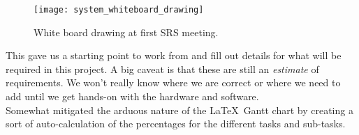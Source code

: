 \documentclass[compsoc,draftclsnofoot,onecolumn,10pt]{IEEEtran}
\begin{document}
\begin{itemize}
            \begin{figure}[H]
              	\texttt{[image: system\_whiteboard\_drawing]}
               \caption{White board drawing at first SRS meeting.}
           \end{figure}

            This gave us a starting point to work from and fill out details for
            what will be required in this project. A big caveat is that these
            are still an \textit{estimate} of requirements. We won't really know
            where we are correct or where we need to add until we get hands-on
            with the hardware and software.\\
            Somewhat mitigated the arduous nature of the \LaTeX~Gantt chart by
            creating a sort of auto-calculation of the percentages for the
            different tasks and sub-tasks.

	\end{itemize}
   
\end{document}
